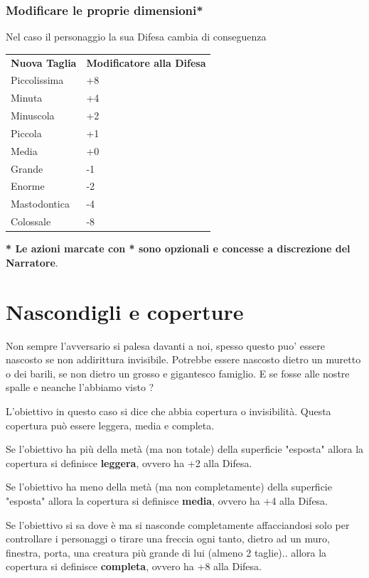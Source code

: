 \documentclass[a4paper,11pt,twoside,openany]{book}
\begin{document}
\subsubsection{Modificare le proprie dimensioni*}

Nel caso il personaggio  la sua Difesa cambia di conseguenza

\bigskip

\begin{tabular}{ll}
	\toprule
	\textbf{Nuova Taglia} & \textbf{Modificatore alla Difesa}\tabularnewline
	Piccolissima          & +8\tabularnewline
	Minuta                & +4\tabularnewline
	Minuscola             & +2\tabularnewline
	Piccola               & +1\tabularnewline
	Media                 & +0\tabularnewline
	Grande                & -1\tabularnewline
	Enorme                & -2\tabularnewline
	Mastodontica          & -4\tabularnewline
	Colossale             & -8\tabularnewline
\end{tabular}

\bigskip

\textbf{{*} Le azioni marcate con {*} sono opzionali e concesse a
	discrezione del Narratore}.

\pagebreak

\section{Nascondigli e coperture}

\label{nascondigli-e-coperture}
Non sempre l'avversario si palesa davanti a noi, spesso questo puo' essere nascosto se non addirittura invisibile.
Potrebbe essere nascosto dietro un muretto o dei barili, se non dietro un grosso e gigantesco famiglio.
E se fosse alle nostre spalle e neanche l'abbiamo visto ?

L'obiettivo in questo caso si dice che abbia copertura o invisibilità. Questa copertura può essere leggera, media e completa.

Se l'obiettivo ha più della metà (ma non totale) della superficie "esposta" allora la copertura si definisce \textbf{leggera}, ovvero ha +2 alla Difesa.

Se l'obiettivo ha meno della metà (ma non completamente) della superficie "esposta" allora la copertura si definisce \textbf{media}, ovvero ha +4 alla Difesa.

Se l'obiettivo si sa dove è ma si nasconde completamente affacciandosi solo per controllare i personaggi o tirare una freccia ogni tanto, dietro ad un muro, finestra, porta, una creatura più grande di lui (almeno 2 taglie).. allora la copertura si definisce \textbf{completa}, ovvero ha +8 alla Difesa.
\end{document}

